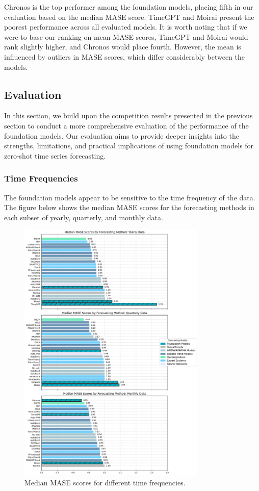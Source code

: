 \documentclass[12pt,a4paper]{article}
\begin{document}
Chronos is the top performer among the foundation models, placing fifth in our evaluation based on the median MASE score. TimeGPT and Moirai present the poorest performance across all evaluated models. It is worth noting that if we were to base our ranking on mean MASE scores, TimeGPT and Moirai would rank slightly higher, and Chronos would place fourth. However, the mean is influenced by outliers in MASE scores, which differ considerably between the models. 

\subsection{Evaluation}

In this section, we build upon the competition results presented in the previous section to conduct a more comprehensive evaluation of the performance of the foundation models. Our evaluation aims to provide deeper insights into the strengths, limitations, and practical implications of using foundation models for zero-shot time series forecasting. 

\subsubsection{Time Frequencies}


The foundation models appear to be sensitive to the time frequency of the data. The figure below shows the median MASE scores for the forecasting methods in each subset of yearly, quarterly, and monthly data. 

\begin{figure}[htbp]
  \centering
  \includegraphics[width=0.8\textwidth]{mase_combined.png}
  \caption{Median MASE scores for different time frequencies.}
  \label{mase_combined_figure}
\end{figure}
\end{document}
